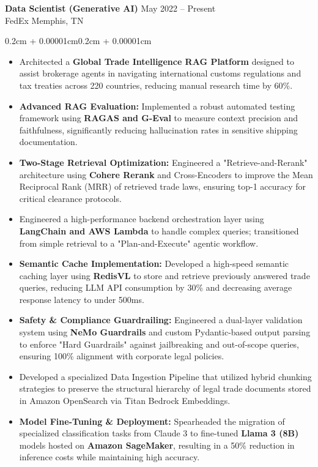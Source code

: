 \documentclass{article}
\newenvironment{highlights}{
    \begin{itemize}[
        topsep=0.10cm, 
        parsep=0.08cm, 
        partopsep=0pt, 
        itemsep=0.08cm, 
        leftmargin=0.4cm + 10pt
    ]
}{
    \end{itemize}
}
\newenvironment{onecolentry}{
    \begin{adjustwidth}{0.2cm + 0.00001cm}{0.2cm + 0.00001cm}
}{
    \end{adjustwidth}
}
\begin{document}
\textbf{Data Scientist (Generative AI)} \hfill May 2022 -- Present \\
FedEx \hfill Memphis, TN
\begin{onecolentry}
    \begin{highlights}
        \item Architected a \textbf{Global Trade Intelligence RAG Platform} designed to assist brokerage agents in navigating international customs regulations and tax treaties across 220 countries, reducing manual research time by 60\%.
        \item \textbf{Advanced RAG Evaluation:} Implemented a robust automated testing framework using \textbf{RAGAS and G-Eval} to measure context precision and faithfulness, significantly reducing hallucination rates in sensitive shipping documentation.
        \item \textbf{Two-Stage Retrieval Optimization:} Engineered a "Retrieve-and-Rerank" architecture using \textbf{Cohere Rerank} and Cross-Encoders to improve the Mean Reciprocal Rank (MRR) of retrieved trade laws, ensuring top-1 accuracy for critical clearance protocols.
        \item Engineered a high-performance backend orchestration layer using \textbf{LangChain and AWS Lambda} to handle complex queries; transitioned from simple retrieval to a "Plan-and-Execute" agentic workflow.
        \item \textbf{Semantic Cache Implementation:} Developed a high-speed semantic caching layer using \textbf{RedisVL} to store and retrieve previously answered trade queries, reducing LLM API consumption by 30\% and decreasing average response latency to under 500ms.
        \item \textbf{Safety \& Compliance Guardrailing:} Engineered a dual-layer validation system using \textbf{NeMo Guardrails} and custom Pydantic-based output parsing to enforce "Hard Guardrails" against jailbreaking and out-of-scope queries, ensuring 100\% alignment with corporate legal policies.
        \item Developed a specialized Data Ingestion Pipeline that utilized hybrid chunking strategies to preserve the structural hierarchy of legal trade documents stored in Amazon OpenSearch via Titan Bedrock Embeddings.
        \item \textbf{Model Fine-Tuning \& Deployment:} Spearheaded the migration of specialized classification tasks from Claude 3 to fine-tuned \textbf{Llama 3 (8B)} models hosted on \textbf{Amazon SageMaker}, resulting in a 50\% reduction in inference costs while maintaining high accuracy.

\end{highlights}
\end{onecolentry}
\end{document}
